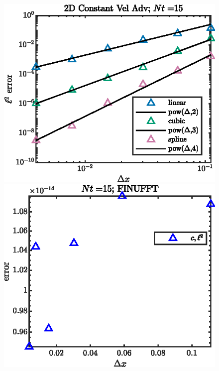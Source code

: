 \documentclass[11pt,letterpaper]{article}
\begin{document}
\begin{figure}[H]
    \centering
    \includegraphics{figs/2D_const_adv_all_interp}
    \includegraphics{figs/2D_const_adv_finufft}
    \caption{}\label{fig:2D_const_adv_all_interp}
\end{figure}
\end{document}
